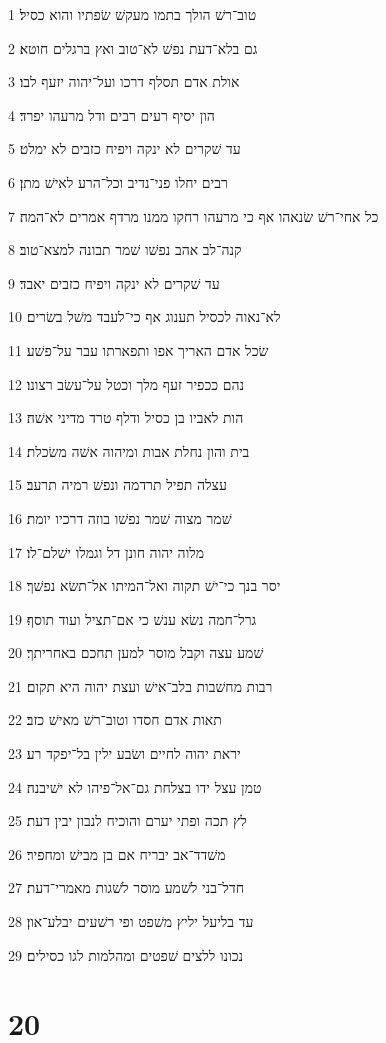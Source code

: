 \par 1 טוב־רשׁ הולך בתמו מעקשׁ שׂפתיו והוא כסיל׃
\par 2 גם בלא־דעת נפשׁ לא־טוב ואץ ברגלים חוטא׃
\par 3 אולת אדם תסלף דרכו ועל־יהוה יזעף לבו׃
\par 4 הון יסיף רעים רבים ודל מרעהו יפרד׃
\par 5 עד שׁקרים לא ינקה ויפיח כזבים לא ימלט׃
\par 6 רבים יחלו פני־נדיב וכל־הרע לאישׁ מתן׃
\par 7 כל אחי־רשׁ שׂנאהו אף כי מרעהו רחקו ממנו מרדף אמרים לא־המה׃
\par 8 קנה־לב אהב נפשׁו שׁמר תבונה למצא־טוב׃
\par 9 עד שׁקרים לא ינקה ויפיח כזבים יאבד׃
\par 10 לא־נאוה לכסיל תענוג אף כי־לעבד משׁל בשׂרים׃
\par 11 שׂכל אדם האריך אפו ותפארתו עבר על־פשׁע׃
\par 12 נהם ככפיר זעף מלך וכטל על־עשׂב רצונו׃
\par 13 הות לאביו בן כסיל ודלף טרד מדיני אשׁה׃
\par 14 בית והון נחלת אבות ומיהוה אשׁה משׂכלת׃
\par 15 עצלה תפיל תרדמה ונפשׁ רמיה תרעב׃
\par 16 שׁמר מצוה שׁמר נפשׁו בוזה דרכיו יומת׃
\par 17 מלוה יהוה חונן דל וגמלו ישׁלם־לו׃
\par 18 יסר בנך כי־ישׁ תקוה ואל־המיתו אל־תשׂא נפשׁך׃
\par 19 גרל־חמה נשׂא ענשׁ כי אם־תציל ועוד תוסף׃
\par 20 שׁמע עצה וקבל מוסר למען תחכם באחריתך׃
\par 21 רבות מחשׁבות בלב־אישׁ ועצת יהוה היא תקום׃
\par 22 תאות אדם חסדו וטוב־רשׁ מאישׁ כזב׃
\par 23 יראת יהוה לחיים ושׂבע ילין בל־יפקד רע׃
\par 24 טמן עצל ידו בצלחת גם־אל־פיהו לא ישׁיבנה׃
\par 25 לץ תכה ופתי יערם והוכיח לנבון יבין דעת׃
\par 26 משׁדד־אב יבריח אם בן מבישׁ ומחפיר׃
\par 27 חדל־בני לשׁמע מוסר לשׁגות מאמרי־דעת׃
\par 28 עד בליעל יליץ משׁפט ופי רשׁעים יבלע־און׃
\par 29 נכונו ללצים שׁפטים ומהלמות לגו כסילים׃

\chapter{20}

